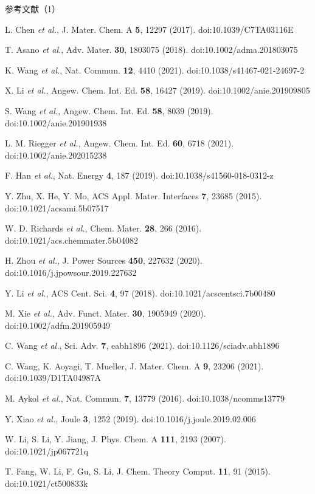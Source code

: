 \documentclass[aspectratio=169,10pt]{beamer}
\newcommand{\rf}[1]{\par\noindent\makebox[2.2em][r]{[#1]}\hspace{.6em}\ignorespaces}
\begin{document}
\begin{frame}[t]{参考文献（1）}
\fontsize{7}{10}\selectfont\setlength{\parskip}{0pt}
\rf{1}L. Chen \textit{et al.}, J. Mater. Chem. A \textbf{5}, 12297 (2017). doi:10.1039/C7TA03116E
\rf{2}T. Asano \textit{et al.}, Adv. Mater. \textbf{30}, 1803075 (2018). doi:10.1002/adma.201803075
\rf{3}K. Wang \textit{et al.}, Nat. Commun. \textbf{12}, 4410 (2021). doi:10.1038/s41467-021-24697-2
\rf{4}X. Li \textit{et al.}, Angew. Chem. Int. Ed. \textbf{58}, 16427 (2019). doi:10.1002/anie.201909805
\rf{5}S. Wang \textit{et al.}, Angew. Chem. Int. Ed. \textbf{58}, 8039 (2019). doi:10.1002/anie.201901938
\rf{6}L. M. Riegger \textit{et al.}, Angew. Chem. Int. Ed. \textbf{60}, 6718 (2021). doi:10.1002/anie.202015238
\rf{7}F. Han \textit{et al.}, Nat. Energy \textbf{4}, 187 (2019). doi:10.1038/s41560-018-0312-z
\rf{8}Y. Zhu, X. He, Y. Mo, ACS Appl. Mater. Interfaces \textbf{7}, 23685 (2015). doi:10.1021/acsami.5b07517
\rf{9}W. D. Richards \textit{et al.}, Chem. Mater. \textbf{28}, 266 (2016). doi:10.1021/acs.chemmater.5b04082
\rf{10}H. Zhou \textit{et al.}, J. Power Sources \textbf{450}, 227632 (2020). doi:10.1016/j.jpowsour.2019.227632
\rf{11}Y. Li \textit{et al.}, ACS Cent. Sci. \textbf{4}, 97 (2018). doi:10.1021/acscentsci.7b00480
\rf{12}M. Xie \textit{et al.}, Adv. Funct. Mater. \textbf{30}, 1905949 (2020). doi:10.1002/adfm.201905949
\rf{13}C. Wang \textit{et al.}, Sci. Adv. \textbf{7}, eabh1896 (2021). doi:10.1126/sciadv.abh1896
\rf{14}C. Wang, K. Aoyagi, T. Mueller, J. Mater. Chem. A \textbf{9}, 23206 (2021). doi:10.1039/D1TA04987A
\rf{15}M. Aykol \textit{et al.}, Nat. Commun. \textbf{7}, 13779 (2016). doi:10.1038/ncomms13779
\rf{16}Y. Xiao \textit{et al.}, Joule \textbf{3}, 1252 (2019). doi:10.1016/j.joule.2019.02.006
\rf{17}W. Li, S. Li, Y. Jiang, J. Phys. Chem. A \textbf{111}, 2193 (2007). doi:10.1021/jp067721q
\rf{18}T. Fang, W. Li, F. Gu, S. Li, J. Chem. Theory Comput. \textbf{11}, 91 (2015). doi:10.1021/ct500833k
\end{frame}
\end{document}
